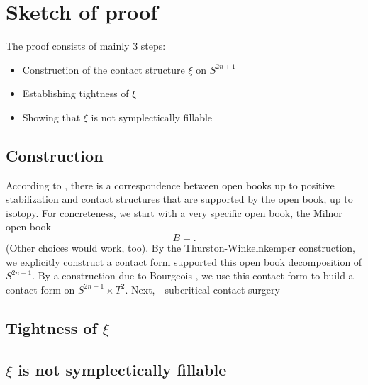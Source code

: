 \documentclass{amsart}
\begin{document}
\section*{Sketch of proof}
The proof consists of mainly 3 steps:
\begin{itemize}
    \item Construction of the contact structure $\xi$ on $S^{2n+1}$
    \item Establishing tightness of $\xi$
    \item Showing that $\xi$ is not symplectically fillable
\end{itemize}
\subsection*{Construction}
According to \cite{Giroux02}, there is a correspondence between open books up to positive
stabilization and contact structures that are supported by the open book, up to isotopy.
For concreteness, we start with a very specific open book, the Milnor open book
\[
    B = .  
\]
(Other choices would work, too).
By the Thurston-Winkelnkemper construction, we explicitly construct a contact form supported
this open book decomposition of $S^{2n-1}$.
By a construction due to Bourgeois \cite{Bourgeois02}, we use this contact form to 
build a contact form on $S^{2n-1} \times T^2$.
Next, 
- subcritical contact surgery

\subsection*{Tightness of $\xi$}

\subsection*{$\xi$ is not symplectically fillable}


\newpage


\end{document}
